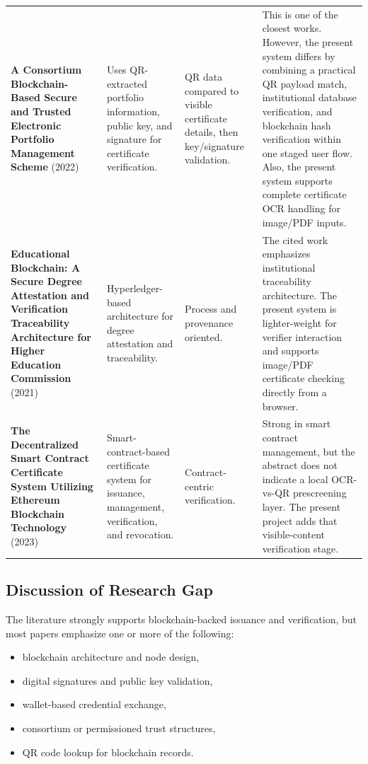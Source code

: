 \documentclass[12pt,a4paper]{article}
\begin{document}
\begin{longtable}{p{3.2cm}p{3.4cm}p{3.2cm}p{4.8cm}}
\textbf{A Consortium Blockchain-Based Secure and Trusted Electronic Portfolio Management Scheme} (2022) & Uses QR-extracted portfolio information, public key, and signature for certificate verification. & QR data compared to visible certificate details, then key/signature validation. & This is one of the closest works. However, the present system differs by combining a practical QR payload match, institutional database verification, and blockchain hash verification within one staged user flow. Also, the present system supports complete certificate OCR handling for image/PDF inputs. \\

\textbf{Educational Blockchain: A Secure Degree Attestation and Verification Traceability Architecture for Higher Education Commission} (2021) & Hyperledger-based architecture for degree attestation and traceability. & Process and provenance oriented. & The cited work emphasizes institutional traceability architecture. The present system is lighter-weight for verifier interaction and supports image/PDF certificate checking directly from a browser. \\

\textbf{The Decentralized Smart Contract Certificate System Utilizing Ethereum Blockchain Technology} (2023) & Smart-contract-based certificate system for issuance, management, verification, and revocation. & Contract-centric verification. & Strong in smart contract management, but the abstract does not indicate a local OCR-vs-QR prescreening layer. The present project adds that visible-content verification stage. \\
\bottomrule
\end{longtable}

\subsection{Discussion of Research Gap}
The literature strongly supports blockchain-backed issuance and verification, but most papers emphasize one or more of the following:
\begin{itemize}[leftmargin=1.5em]
\item blockchain architecture and node design,
\item digital signatures and public key validation,
\item wallet-based credential exchange,
\item consortium or permissioned trust structures,
\item QR code lookup for blockchain records.
\end{itemize}
\end{document}
